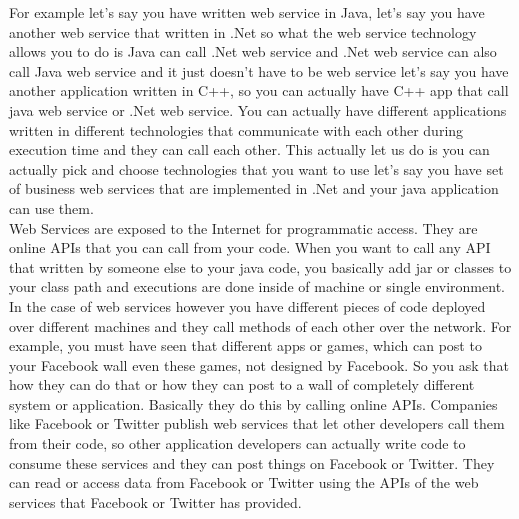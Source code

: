 For example let’s say you have written web service in Java, let’s say you have another web service that written in .Net so what
the web service technology allows you to do is Java can call .Net web service and .Net web service can also call Java web
service and it just doesn’t have to be web service let’s say you have another application written in C++, so you can actually
have C++ app that call java web service or .Net web service. You can actually have different applications written in different
technologies that communicate with each other during execution time and they can call each other. This actually let us do is
you can actually pick and choose technologies that you want to use let’s say you have set of business web services that are
implemented in .Net and your java application can use them.\\

Web Services are exposed to the Internet for programmatic access. They are online APIs that you can call from your code.
When you want to call any API that written by someone else to your java code, you basically add jar or classes to your class
path and executions are done inside of machine or single environment. In the case of web services however you have different
pieces of code deployed over different machines and they call methods of each other over the network. For example, you must
have seen that different apps or games, which can post to your Facebook wall even these games, not designed by Facebook.
So you ask that how they can do that or how they can post to a wall of completely different system or application. Basically
they do this by calling online APIs. Companies like Facebook or Twitter publish web services that let other developers call
them from their code, so other application developers can actually write code to consume these services and they can post
things on Facebook or Twitter. They can read or access data from Facebook or Twitter using the APIs of the web services that
Facebook or Twitter has provided.\\

